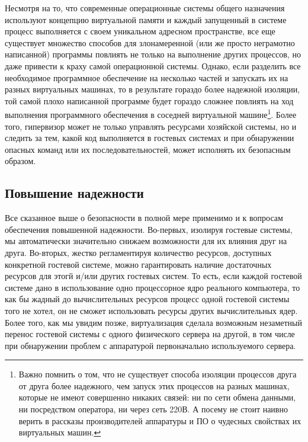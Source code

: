 \documentclass[14pt, a4paper]{article}
\begin{document}
Несмотря на то, что современные операционные системы общего назначения
используют концепцию виртуальной памяти и каждый запущенный в системе процесс
выполняется с своем уникальном адресном пространстве, все еще существует
множество способов для злонамеренной (или же просто неграмотно написанной)
программы повлиять не только на выполнение других процессов, но даже привести к
краху самой операционной системы. Однако, если разделить все необходимое
программное обеспечение на несколько частей и запускать их на разных виртуальных
машинах, то в результате гораздо более надежной изоляции, той самой плохо
написанной программе будет гораздо сложнее повлиять на ход выполнения
программного обеспечения в соседней виртуальной машине\footnote{Важно помнить о том, что не существует способа изоляции процессов друга от друга более
надежного, чем запуск этих процессов на разных машинах, которые не имеют совершенно
никаких связей: ни по сети обмена данными, ни посредством оператора, ни через сеть 220В. А
посему не стоит наивно верить в рассказы производителей аппаратуры и ПО о чудесных
свойствах их виртуальных машин.}.
Более того, гипервизор может не только управлять ресурсами хозяйской системы, но и
следить за тем, какой код выполняется в гостевых системах и при обнаружении
опасных команд или их последовательностей, может исполнять их безопасным
образом.

\subsection*{Повышение надежности}

Все сказанное выше о безопасности в полной мере применимо и к вопросам
обеспечения повышенной надежности. Во-первых, изолируя гостевые системы, мы
автоматически значительно снижаем возможности для их влияния друг на друга.
Во-вторых, жестко регламентируя количество ресурсов, доступных конкретной
гостевой системе, можно гарантировать наличие достаточных ресурсов для этогй и/или
других гостевых систем. То есть, если каждой гостевой системе дано в использование
одно процессорное ядро реального компьютера, то как бы жадный до вычислительных
ресурсов процесс одной гостевой системы того не хотел, он не сможет использовать
ресурсы других вычислительных ядер. Более того, как мы увидим позже,
виртуализация сделала возможным незаметный перенос гостевой системы с одного
физического сервера на другой, в том числе при обнаружении проблем с аппаратурой
первоначально используемого сервера.
\end{document}
